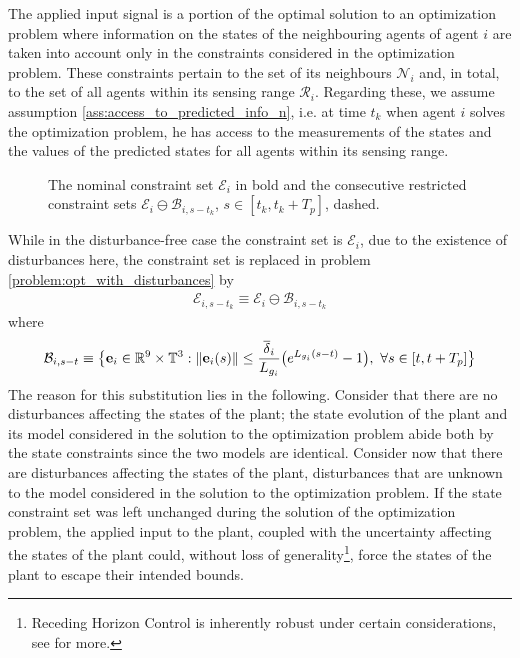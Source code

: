 The applied input signal is a portion of the optimal solution to an
optimization problem where information on the states of the neighbouring agents
of agent $i$ are taken into account only in the constraints considered in the
optimization problem. These constraints pertain to the set of its neighbours
$\mathcal{N}_i$ and, in total, to the set of all agents within its sensing
range $\mathcal{R}_i$. Regarding these, we assume assumption
\eqref{ass:access_to_predicted_info_n}, i.e. at time $t_k$ when agent $i$
solves the optimization problem, he has access to the measurements of the states
and the values of the predicted states for all agents within its sensing range.




\begin{figure}[ht!]
  \centering
  
  \caption{The nominal constraint set $\mathcal{E}_i$ in bold and the
    consecutive restricted constraint sets $\mathcal{E}_i \ominus \mathcal{B}_{i, s-t_k}$,
    $s \in [t_k, t_k + T_p]$, dashed.}
\end{figure}

While in the disturbance-free case the constraint set is $\mathcal{E}_i$,
due to the existence of disturbances here, the constraint set is replaced in
problem \eqref{problem:opt_with_disturbances} by
\begin{align}
  \mathcal{E}_{i, s-t_k} \equiv \mathcal{E}_i \ominus \mathcal{B}_{i,s-t_k}
\label{eq:restricted_constraint_set}
\end{align}
where
\begin{align}
  \mathcal{B}_{i,s-t} \equiv \big\{ \bm{\mathbf{e}}_i \in \mathbb{R}^9 \times \mathbb{T}^3 :
    \|\bm{\mathbf{e}}_i(s)\| \leq \dfrac{\overline{\delta}_i}{L_{g_i}}\big( e^{L_{g_i}(s - t)} - 1\big),\ \forall s \in [t, t + T_p] \big\}
\label{eq:b_restricted_constraint_set}
\end{align}
The reason for this substitution lies in the following. Consider that there
are no disturbances affecting the states of the plant; the state evolution of
the plant and its model considered in the solution to the optimization problem
abide both by the state constraints since the two models are identical. Consider
now that there are disturbances affecting the states of the plant, disturbances
that are unknown to the model considered in the solution to the optimization
problem. If the state constraint set was left unchanged during the solution of
the optimization problem, the applied input to the plant, coupled with the
uncertainty affecting the states of the plant could, without loss of
generality\footnote{Receding Horizon Control is inherently robust
under certain considerations, see \cite{Fontes2007} for more.}, force the states
of the plant to escape their intended bounds.

